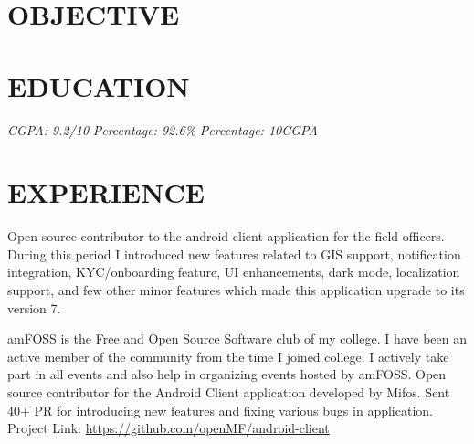 \documentclass[11pt,a4paper,sans]{moderncv}        %
\begin{document}
\makecvtitle

\section{OBJECTIVE}

\section{EDUCATION}
{\textit{CGPA: 9.2/10}}{}  %
{\textit{Percentage: 92.6\%  }}{}  %
{\textit{Percentage: 10CGPA  }}{}  %

\section{EXPERIENCE}
{Open source contributor to the android client application for the field officers. During this period I introduced new features related to GIS support, notification integration, KYC/onboarding feature, UI enhancements, dark mode, localization support, and few other minor features which made this application upgrade to its version 7.}

{amFOSS is the Free and Open Source Software club of my college. I have been an active member of the community from the time I joined college. I actively take part in all events and also help in organizing events hosted by amFOSS.}
{ Open source contributor for the Android Client application developed by Mifos. Sent 40+ PR for introducing new features and fixing various bugs in application. Project Link: {\newline} 
\url{https://github.com/openMF/android-client}}{}  %
\end{document}
